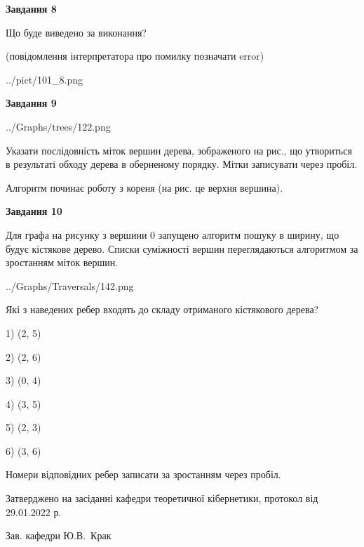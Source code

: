 \documentclass[12pt, ukrainian]{article}
\begin{document}
{\begin {large}
{\begin {center}\textbf{Завдання 8}\end {center}}\par
Що буде виведено за виконання?\par
 (повідомлення інтерпретатора про помилку позначати error)\par
\begin{center}
	{../pict/101_8.png}
\end{center}
\newpage

{\begin {center}\textbf{Завдання 9}\end {center}}\par

\begin{center}
	{../Graphs/trees/122.png}
\end{center}
Указати послідовність міток вершин дерева, зображеного на рис., що утвориться в результаті обходу дерева в оберненому порядку. Мітки записувати через пробіл.\par Алгоритм починає роботу з кореня (на рис. це верхня вершина).\par
\newpage

{\begin {center}\textbf{Завдання 10}\end {center}}\par
Для графа на рисунку з вершини 0 запущено алгоритм пошуку в ширину, що будує кістякове дерево. Списки суміжності вершин переглядаються алгоритмом за зростанням міток вершин.\par
\begin{center}
	{../Graphs/Traversals/142.png}
\end{center}
\par Які з наведених ребер входять до складу отриманого кістякового дерева?\par
1) (2, 5)\par
2) (2, 6)\par
3) (0, 4)\par
4) (3, 5)\par
5) (2, 3)\par
6) (3, 6)\par
{\vskip 15pt} Номери відповідних ребер записати за зростанням через пробіл.\par
\newpage


\end {large}
}
{\smallskip \begin {small} Затверджено на засіданні кафедри теоретичної кібернетики, протокол  від   29.01.2022 р.\par\smallskip\smallskip
{\parbox {6.5 cm}{Зав. кафедри \dotfill Ю.В.~Крак}} \end{small}}
\end{document}
